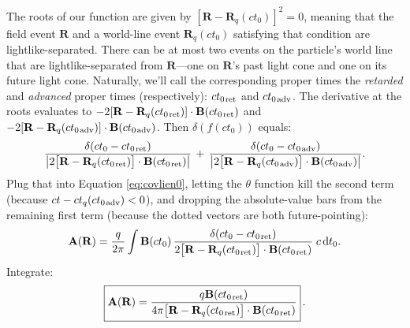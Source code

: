 \documentclass[12pt]{article}
\renewcommand{\vv}[1]{\mathbf{#1}}
\newcommand{\dd}[1]{\mathrm{d}#1}
\begin{document}
The roots of our function are given by $[\vv R - \vv R_{q}(ct_0)]^2 = 0$, meaning that the field event $\vv R$ and a world-line event $\vv R_{q}(ct_0)$ satisfying that condition are lightlike-separated. There can be at most two events on the particle's world line that are lightlike-separated from $\vv R$---one on $\vv R$'s past light cone and one on its future light cone. Naturally, we'll call the corresponding proper times the \emph{retarded} and \emph{advanced} proper times (respectively): $ct_{0 \mkern2mu \textrm{ret}}$ and $ct_{0 \mkern2mu \textrm{adv}}$. The derivative at the roots evaluates to $- 2 [ \vv R - \vv R_{q} (ct_{0 \mkern2mu \textrm{ret}})] \cdot \vv B (ct_{0 \mkern2mu \textrm{ret}})$ and $- 2 [ \vv R - \vv R_{q} (ct_{0 \mkern2mu \textrm{adv}})] \cdot \vv B (ct_{0 \mkern2mu \textrm{adv}})$. Then $\delta (f(ct_0))$ equals:
\begin{equation*}
\dfrac{\delta(ct_0 - ct_{0 \mkern2mu \textrm{ret}})}{ \big \vert 2 \big[ \vv R - \vv R_{q} (ct_{0 \mkern2mu \textrm{ret}}) \big] \cdot \vv B (ct_{0 \mkern2mu \textrm{ret}}) \big \vert} \, + \, \dfrac{\delta(ct_0 - ct_{0 \mkern2mu \textrm{adv}})}{ \big \vert 2 \big[ \vv R - \vv R_{q} (ct_{0 \mkern2mu \textrm{adv}}) \big] \cdot \vv B (ct_{0 \mkern2mu \textrm{adv}}) \big \vert}.
\end{equation*}
Plug that into Equation \ref{eq:covlien0}, letting the $\theta$ function kill the second term (because $ct - ct_q(ct_{0 \mkern2mu \textrm{adv}}) < 0$), and dropping the absolute-value bars from the remaining first term (because the dotted vectors are both future-pointing):
\begin{equation*}
\vv A(\vv R) = \dfrac{q}{2 \pi} \int \vv B(ct_0) \,\dfrac{\delta(ct_0 - ct_{0 \mkern2mu \textrm{ret}})}{2 \big[ \vv R - \vv R_{q} (ct_{0 \mkern2mu \textrm{ret}}) \big] \cdot \vv B (ct_{0 \mkern2mu \textrm{ret}})} \; c \, \dd t_0 .
\end{equation*}
Integrate:
\begin{equation}\label{eq:covlien}
\boxed{ \vv A(\vv R) = \dfrac{q \vv B(ct_{0 \mkern2mu \textrm{ret}})}{4 \pi \big[ \vv R - \vv R_{q} (ct_{0 \mkern2mu \textrm{ret}}) \big] \cdot \vv B (ct_{0 \mkern2mu \textrm{ret}})} } \, .
\end{equation}
\end{document}

